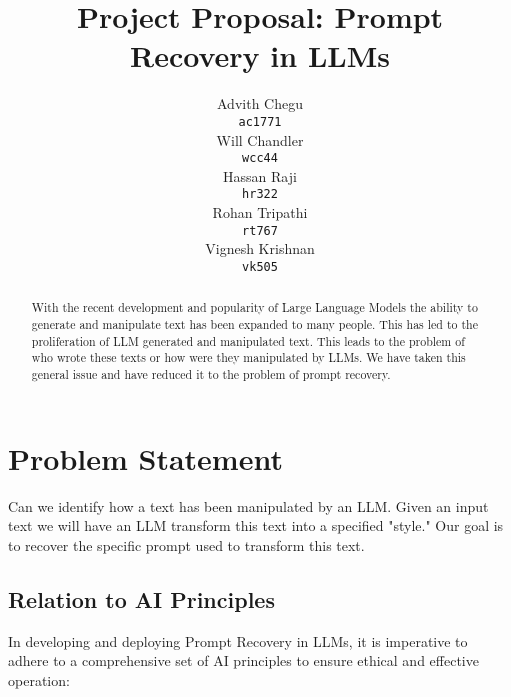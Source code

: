 \documentclass{article}
\title{Project Proposal: Prompt Recovery in LLMs}
\author{
  Advith Chegu \\
  \texttt{ac1771} \\
  \And
  Will Chandler \\
  \texttt{wcc44} \\
  \And
  Hassan Raji \\
  \texttt{hr322} \\
  \And
  Rohan Tripathi \\
  \texttt{rt767} \\
  \And
  Vignesh Krishnan \\
  \texttt{vk505} \\
}
\begin{document}
\maketitle

\begin{abstract}

With the recent development and popularity of Large Language Models the ability to generate and manipulate text has been expanded to many people. This has led to the proliferation of LLM generated and manipulated text. This leads to the problem of who wrote these texts or how were they manipulated by LLMs. We have taken this general issue and have reduced it to the problem of prompt recovery. 

\end{abstract}

\section{Problem Statement}
Can we identify how a text has been manipulated by an LLM. Given an input text we will have an LLM transform this text into a specified "style." Our goal is to recover the specific prompt used to transform this text. 

\subsection{Relation to AI Principles}

In developing and deploying Prompt Recovery in LLMs, it is imperative to adhere to a comprehensive set of AI principles to ensure ethical and effective operation:
\end{document}

